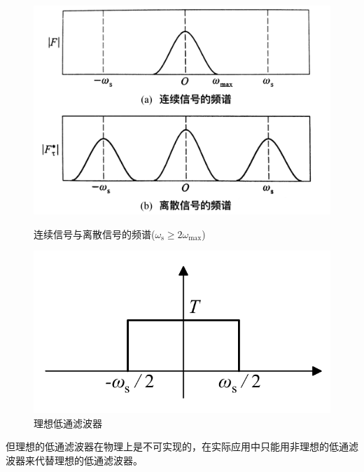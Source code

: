\begin{figure}[!htb]
	\begin{minipage}{0.6\linewidth}
		\includegraphics[width=\linewidth]{pic/连续与离散信号2.jpg}
		\vspace*{-1em}
		\caption{连续信号与离散信号的频谱($\omega_{\text{s}} \ge 2 \omega_\max$)}
		\label{连续与离散信号2}
	\end{minipage}
	\begin{minipage}{0.4\linewidth}
		\vspace*{11em}
		\includegraphics[width=\linewidth]{pic/理想低通滤波器.pdf}
		\vspace*{-1em}
		\caption{理想低通滤波器}
		\label{理想低通滤波器}
	\end{minipage}
\end{figure}
但理想的低通滤波器在物理上是不可实现的，在实际应用中只能用非理想的低通滤波器来代替理想的低通滤波器。

